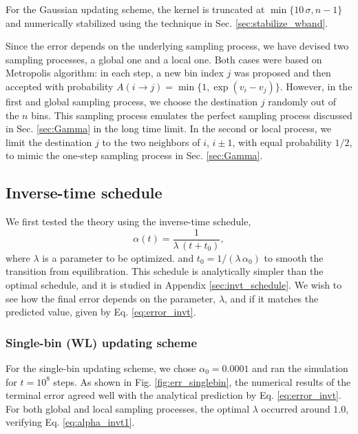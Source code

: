 \documentclass[reprint, floatfix]{revtex4-1}
\begin{document}
For the Gaussian updating scheme,
the kernel is truncated at
$\min\{10 \, \sigma, n - 1\}$
and numerically stabilized
using the technique
in Sec. \ref{sec:stabilize_wband}.



Since the error depends on
the underlying sampling process,
we have devised two sampling processes,
a global one and a local one.
%
Both cases were based on
Metropolis algorithm\cite{metropolis1953, newman, frenkel,
landau_binder}:
%
in each step, a new bin index $j$ was proposed
and then accepted with probability
%
$
A(i \to j) = \min\{ 1, \exp(v_i - v_j) \}.
$
However,
in the first and global sampling process,
we choose the destination $j$
randomly out of the $n$ bins.
%
This sampling process
emulates the perfect sampling process
discussed in Sec. \ref{sec:Gamma}
in the long time limit.
%
In the second or local process,
we limit the destination $j$
to the two neighbors of $i$,
$i \pm 1$, with equal probability $1/2$,
to mimic the one-step sampling process
in Sec. \ref{sec:Gamma}.
%



\subsection{Inverse-time schedule}



We first tested the theory using
the inverse-time schedule,
%
\begin{equation}
\alpha(t) = \frac{1}{\lambda \, (t + t_0) },
\label{eq:alpha_invtlambda}
\end{equation}
%
where $\lambda$ is a parameter to be optimized.
and $t_0 = 1/(\lambda \, \alpha_0)$
to smooth the transition from equilibration.
%
This schedule is analytically simpler
than the optimal schedule,
and it is studied in Appendix \ref{sec:invt_schedule}.
%
We wish to see how the final error
depends on the parameter, $\lambda$,
and if it matches the predicted value,
given by Eq. \eqref{eq:error_invt}.


\subsubsection{Single-bin (WL) updating scheme}



For the single-bin updating scheme,
we chose $\alpha_0 = 0.0001$
and ran the simulation for $t = 10^8$ steps.
%
As shown in Fig. \ref{fig:err_singlebin},
the numerical results of the terminal error agreed well with
the analytical prediction by Eq. \eqref{eq:error_invt}.
%
For both global and local sampling processes,
the optimal $\lambda$ occurred around $1.0$,
verifying Eq. \eqref{eq:alpha_invt1}.
%
\end{document}
